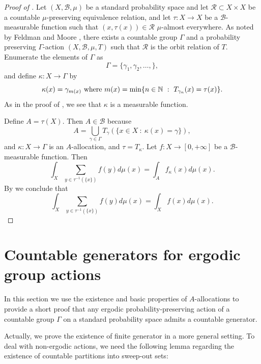 \documentclass[12pt,reqno]{amsart}
\begin{document}

\begin{proof}[Proof of ]
 Let $(X,\mathcal{B},\mu)$ be a standard probability space and let $\mathcal{R} \subset X \times X$ be a countable $\mu$-preserving equivalence relation, and let $\tau:X \to X$ be a $\mathcal{B}$-measurable function such that $(x,\tau(x)) \in \mathcal{R}$ $\mu$-almost everywhere. As noted by Feldman and Moore \cite{MR578656}, there exists a countable group $\Gamma$ and a probability preserving $\Gamma$-action $(X,\mathcal{B},\mu,T)$ such that $\mathcal{R}$ is the orbit relation of $T$.
 Enumerate the elements of $\Gamma$ as 
 \[\Gamma = \{\gamma_1,\gamma_2,\ldots,\},\]
 and define $\kappa:X \to \Gamma$ by 
 \[
 \kappa(x) = \gamma_{m(x)} \mbox{ where } m(x)= \min\{ n \in \mathbb{N}~:~ T_{\gamma_n}(x) = \tau(x)\}.
 \]
As in the proof of , we see that $\kappa$ is a measurable function.

 Define $A= \tau(X)$.
 Then $A \in \mathcal{B}$ because
 \[
 A= \bigcup_{\gamma \in \Gamma} T_\gamma(\{ x\in X~:~\kappa(x) = \gamma\}),
 \]
 and
 $\kappa:X \to \Gamma$ is an $A$-allocation, and $\tau = T_\kappa$.
 Let  $f:X \to [0,+\infty]$ be a  $\mathcal{B}$-measurable function.
 Then 
 \[\int_X \sum_{y \in \tau^{-1}(\{x\})}f(y) d\mu(x)= \int_A f_\kappa(x) d\mu(x).\]
 By  we conclude that 
 \[
 \int_X \sum_{y \in \tau^{-1}(\{x\})}f(y) d\mu(x)= \int_X f(x) d\mu(x).
 \]

\end{proof}

\section{Countable generators for ergodic group actions}

In this section we use the existence and basic properties of $A$-allocations to provide a short proof that any ergodic probability-preserving action of a countable group $\Gamma$ on a standard probability space admits a countable generator. 

Actually, we prove the existence of finite generator in a more general setting. To deal with non-ergodic actions, we need the following lemma regarding the existence of countable partitions into sweep-out sets:

\end{document}
